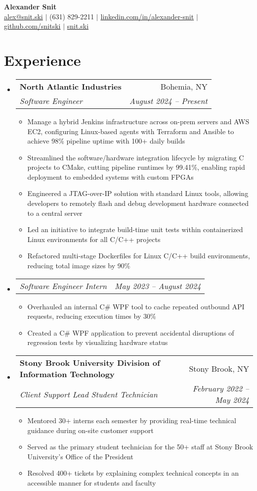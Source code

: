\documentclass[letterpaper,11pt]{article}
\makeatletter
\newcommand{\resumeItem}[1]{
  \item\small{
    {#1 \vspace{-2pt}}
  }
}
\newcommand{\resumeSubheading}[4]{
  \vspace{-2pt}\item
    \begin{tabular*}{0.97\textwidth}[t]{l@{\extracolsep{\fill}}r}
      \textbf{#1} & #2 \\
      \textit{\small#3} & \textit{\small #4} \\
    \end{tabular*}\vspace{-7pt}
}
\newcommand{\resumeSubSubheading}[2]{
    \item
    \begin{tabular*}{0.97\textwidth}{l@{\extracolsep{\fill}}r}
      \textit{\small#1} & \textit{\small #2} \\
    \end{tabular*}\vspace{-7pt}
}
\newcommand{\resumeSubHeadingListStart}{\begin{itemize}[leftmargin=0.15in, label={}]}
\newcommand{\resumeSubHeadingListEnd}{\end{itemize}}
\newcommand{\resumeItemListStart}{\begin{itemize}}
\newcommand{\resumeItemListEnd}{\end{itemize}\vspace{-5pt}}
\makeatother
\begin{document}
\begin{center}
    \textbf{\Huge Alexander Snit} \\ \vspace{1pt}
    \href{mailto:alex@snit.ski}{alex@snit.ski} $|$
    (631) 829-2211 $|$
    \href{https://linkedin.com/in/alexander-snit}{linkedin.com/in/alexander-snit} $|$
    \href{https://github.com/snitski}{github.com/snitski} $|$
    \href{https://snit.ski}{snit.ski}
\end{center}

\section{Experience}
    \resumeSubHeadingListStart
        \resumeSubheading
        {North Atlantic Industries}{Bohemia, NY}
        {Software Engineer}{August 2024 -- Present}
        \resumeItemListStart
            \resumeItem{Manage a hybrid Jenkins infrastructure across on-prem servers and AWS EC2, configuring Linux-based agents with Terraform and Ansible to achieve 98\% pipeline uptime with 100+ daily builds}
            \resumeItem{Streamlined the software/hardware integration lifecycle by migrating C projects to CMake, cutting pipeline runtimes by 99.41\%, enabling rapid deployment to embedded systems with custom FPGAs}
            \resumeItem{Engineered a JTAG-over-IP solution with standard Linux tools, allowing developers to remotely flash and debug development hardware connected to a central server}
            \resumeItem{Led an initiative to integrate build-time unit tests within containerized Linux environments for all C/C++ projects}
            \resumeItem{Refactored multi-stage Dockerfiles for Linux C/C++ build environments, reducing total image sizes by 90\%}
        \resumeItemListEnd

        \resumeSubSubheading
        {Software Engineer Intern}{May 2023 -- August 2024}
        \resumeItemListStart
            \resumeItem{Overhauled an internal C\# WPF tool to cache repeated outbound API requests, reducing execution times by 30\%}
            \resumeItem{Created a C\# WPF application to prevent accidental disruptions of regression tests by visualizing hardware status}
        \resumeItemListEnd

        \resumeSubheading
        {Stony Brook University Division of Information Technology}{Stony Brook, NY}
        {Client Support Lead Student Technician}{February 2022 -- May 2024}
        \resumeItemListStart
            \resumeItem{Mentored 30+ interns each semester by providing real-time technical guidance during on-site customer support}
            \resumeItem{Served as the primary student technician for the 50+ staff at Stony Brook University's Office of the President}
            \resumeItem{Resolved 400+ tickets by explaining complex technical concepts in an accessible manner for students and faculty}
        \resumeItemListEnd
    \resumeSubHeadingListEnd
\end{document}
